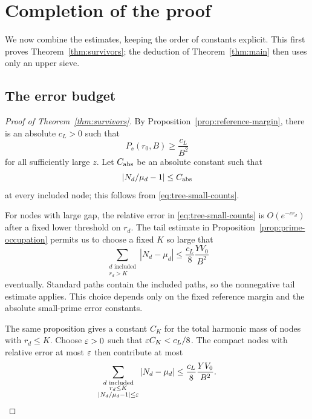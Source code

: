 \section{Completion of the proof}\label{sec:assembly}

We now combine the estimates, keeping the order of constants explicit.
This first proves Theorem~\ref{thm:survivors}; the deduction of
Theorem~\ref{thm:main} then uses only an upper sieve.

\subsection{The error budget}

\begin{proof}[Proof of Theorem~\ref{thm:survivors}]
By Proposition~\ref{prop:reference-margin}, there is an absolute
$c_L>0$ such that
\begin{equation}\label{eq:assembly-reference}
 P_\ee(r_0,B)\ge\frac{c_L}{B^2}
\end{equation}
for all sufficiently large $z$. Let $C_{\rm abs}$ be an absolute
constant such that
\[
 \left|N_d/\mu_d-1\right|\le C_{\rm abs}
\]
at every included node; this follows from
\eqref{eq:tree-small-counts}.

For nodes with large gap, the relative error in
\eqref{eq:tree-small-counts} is $O(e^{-cr_d})$ after a fixed lower
threshold on $r_d$. The tail estimate in
Proposition~\ref{prop:prime-occupation} permits us to choose a fixed
$K$ so large that
\begin{equation}\label{eq:assembly-tail}
 \sum_{\substack{d\text{ included}\\r_d>K}}
 |N_d-\mu_d|
 \le\frac{c_L}{8}\frac{YV_0}{B^2}
\end{equation}
eventually. Standard paths contain the included paths, so the
nonnegative tail estimate applies. This choice depends only on the
fixed reference margin and the absolute small-prime error constants.

The same proposition gives a constant $C_K$ for the total harmonic
mass of nodes with $r_d\le K$. Choose $\varepsilon>0$ such that
$\varepsilon C_K<c_L/8$. The compact nodes with relative error at most
$\varepsilon$ then contribute at most
\begin{equation}\label{eq:assembly-good-compact}
 \sum_{\substack{d\text{ included}\\r_d\le K\\
                    |N_d/\mu_d-1|\le\varepsilon}}
 |N_d-\mu_d|
 \le\frac{c_L}{8}\frac{YV_0}{B^2}.
\end{equation}


\end{proof}
